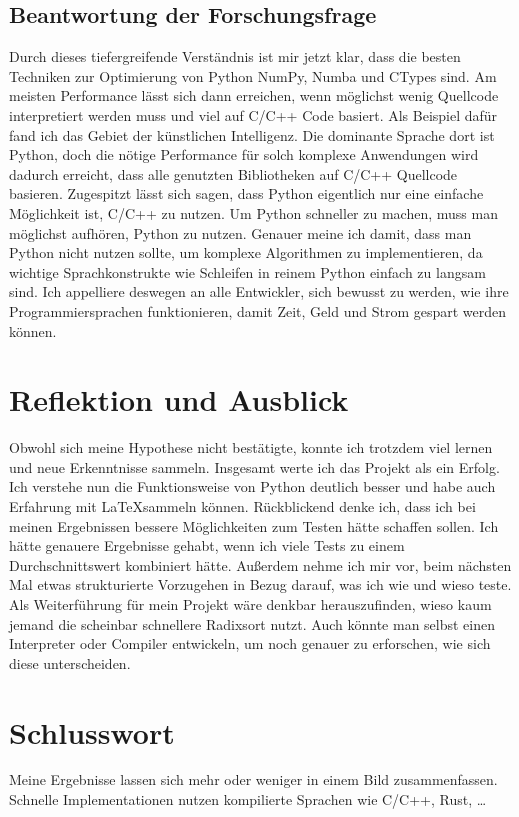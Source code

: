 \documentclass[11pt,a4paper]{article}
\begin{document}
\subsection{Beantwortung der Forschungsfrage}
Durch dieses tiefergreifende Verständnis ist mir jetzt klar, dass die besten Techniken zur
Optimierung von Python NumPy, Numba und CTypes sind. Am meisten Performance lässt sich dann erreichen,
wenn möglichst wenig Quellcode interpretiert werden muss und viel auf C/C++ Code basiert.
Als Beispiel dafür fand ich das Gebiet der künstlichen Intelligenz.
Die dominante Sprache dort ist Python, doch die nötige Performance für solch komplexe Anwendungen
wird dadurch erreicht, dass alle genutzten Bibliotheken auf C/C++ Quellcode basieren.
Zugespitzt lässt sich sagen, dass Python eigentlich nur eine einfache Möglichkeit ist,
C/C++ zu nutzen. Um Python schneller zu machen, muss man möglichst aufhören, Python zu nutzen.
Genauer meine ich damit, dass man Python nicht nutzen sollte, um komplexe Algorithmen zu implementieren,
da wichtige Sprachkonstrukte wie Schleifen in reinem Python einfach zu langsam sind.
Ich appelliere deswegen an alle Entwickler, sich bewusst zu werden, wie ihre Programmiersprachen
funktionieren, damit Zeit, Geld und Strom gespart werden können.


\section{Reflektion und Ausblick}
Obwohl sich meine Hypothese nicht bestätigte, konnte ich trotzdem viel lernen
und neue Erkenntnisse sammeln. Insgesamt werte ich das Projekt als ein Erfolg.
Ich verstehe nun die Funktionsweise von Python deutlich besser und habe auch Erfahrung
mit \LaTeX sammeln können.
Rückblickend denke ich, dass ich bei meinen Ergebnissen bessere Möglichkeiten zum Testen
hätte schaffen sollen. Ich hätte genauere Ergebnisse gehabt, wenn ich viele Tests zu einem
Durchschnittswert kombiniert hätte.
Außerdem nehme ich mir vor, beim nächsten Mal etwas strukturierte Vorzugehen in Bezug darauf,
was ich wie und wieso teste.
Als Weiterführung für mein Projekt wäre denkbar herauszufinden, wieso kaum jemand die scheinbar
schnellere Radixsort nutzt.
Auch könnte man selbst einen Interpreter oder Compiler entwickeln, um noch genauer zu erforschen,
wie sich diese unterscheiden.

\section{Schlusswort}
Meine Ergebnisse lassen sich mehr oder weniger in einem Bild zusammenfassen.
Schnelle Implementationen nutzen kompilierte Sprachen wie C/C++, Rust, \dots
\end{document}

